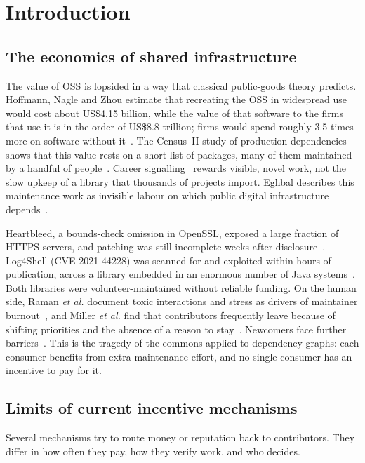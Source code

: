 \documentclass[conference]{IEEEtran}
\begin{document}
\section{Introduction}

\subsection{The economics of shared infrastructure}
The value of OSS is lopsided in a way that classical public-goods theory predicts. Hoffmann, Nagle and Zhou estimate that recreating the OSS in widespread use would cost about US\$4.15 billion, while the value of that software to the firms that use it is in the order of US\$8.8 trillion; firms would spend roughly 3.5 times more on software without it~\cite{hoffmann2024value}. The Census~II study of production dependencies shows that this value rests on a short list of packages, many of them maintained by a handful of people~\cite{nagle2022census}. Career signalling~\cite{lerner2002simple} rewards visible, novel work, not the slow upkeep of a library that thousands of projects import. Eghbal describes this maintenance work as invisible labour on which public digital infrastructure depends~\cite{eghbal2016roads,eghbal2020working}.

Heartbleed, a bounds-check omission in OpenSSL, exposed a large fraction of HTTPS servers, and patching was still incomplete weeks after disclosure~\cite{durumeric2014heartbleed}. Log4Shell (CVE-2021-44228) was scanned for and exploited within hours of publication, across a library embedded in an enormous number of Java systems~\cite{hiesgen2022log4j}. Both libraries were volunteer-maintained without reliable funding. On the human side, Raman \textit{et al.} document toxic interactions and stress as drivers of maintainer burnout~\cite{raman2020burnout}, and Miller \textit{et al.} find that contributors frequently leave because of shifting priorities and the absence of a reason to stay~\cite{miller2019flossing}. Newcomers face further barriers~\cite{steinmacher2015barriers}. This is the tragedy of the commons applied to dependency graphs: each consumer benefits from extra maintenance effort, and no single consumer has an incentive to pay for it.

\subsection{Limits of current incentive mechanisms}
Several mechanisms try to route money or reputation back to contributors. They differ in how often they pay, how they verify work, and who decides.
\end{document}
